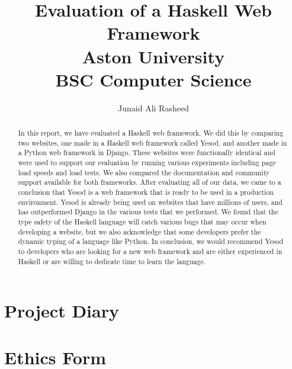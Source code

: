 \documentclass[a4paper,11pt,abstract=on,thesis,twoside]{report}
\title{
	{Evaluation of a Haskell Web Framework}\\
	{\large Aston University}\\
	{\large BSC Computer Science}
}
\author{Junaid Ali Rasheed}
\begin{document}


\maketitle



\tableofcontents
\listoffigures
\lstlistoflistings

\begin{abstract}
	In this report, we have evaluated a Haskell web framework. We did this by comparing
	two websites, one made in a Haskell web framework called Yesod, and another made
	in a Python web framework in Django. These websites were functionally identical
	and were used to support our evaluation by running various experiments including
	page load speeds and load tests. We also compared the documentation and community
	support available for both frameworks. After evaluating all of our data, we came
	to a conclusion that Yesod is a web framework that is ready to be used in a production
	environment. Yesod is already being used on websites that have millions of users,
	and has outperformed Django in the various tests that we performed. We found that the
	type safety of the Haskell language will catch various bugs that may occur when
	developing a website, but we also acknowledge that some developers prefer the dynamic
	typing of a language like Python. In conclusion, we would recommend Yesod to
	developers who are looking for a new web framework and are either experienced
	in Haskell or are willing to dedicate time to learn the language.
\end{abstract}

\cleardoublepage

\pagestyle{fancy}








\printbibliography[heading=bibintoc,title={References}]

\begin{refsection}
\nocite{*}
\printbibliography[heading=bibintoc,title={Bibliography}]  
\end{refsection}

\begin{appendices}



	
\chapter{Project Diary}


\chapter{Ethics Form}


\end{appendices}
\end{document}
